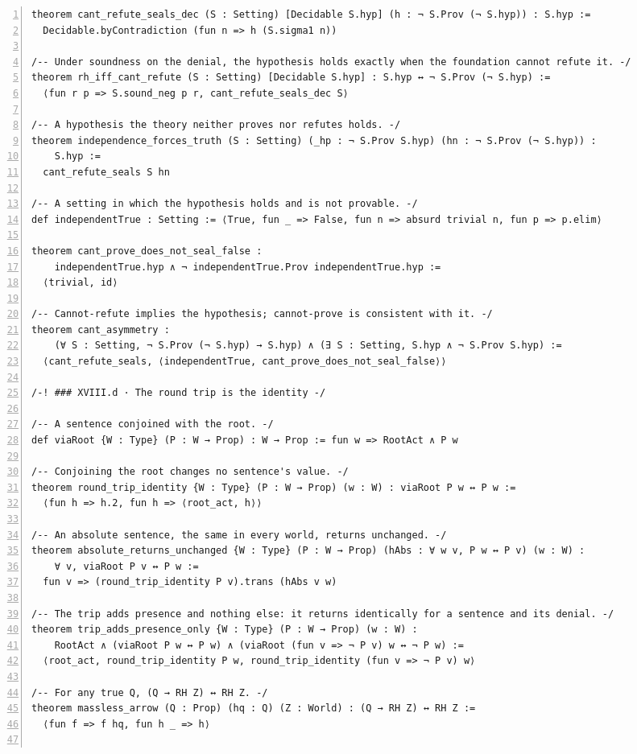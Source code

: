 \documentclass[10pt]{article}
\newcommand{\leansize}{\fontsize{5.5pt}{6.75pt}\selectfont}
\begin{document}
\begin{multicols}{2}
\begin{Verbatim}[numbers=left,firstnumber=1,numbersep=3pt,xleftmargin=2.6em,breaklines=true,breakanywhere=true,breakautoindent=false,breakindent=1.4em,breaksymbolleft={},breakanywheresymbolpre={},fontsize=\leansize]
theorem cant_refute_seals_dec (S : Setting) [Decidable S.hyp] (h : ¬ S.Prov (¬ S.hyp)) : S.hyp :=
  Decidable.byContradiction (fun n => h (S.sigma1 n))

/-- Under soundness on the denial, the hypothesis holds exactly when the foundation cannot refute it. -/
theorem rh_iff_cant_refute (S : Setting) [Decidable S.hyp] : S.hyp ↔ ¬ S.Prov (¬ S.hyp) :=
  ⟨fun r p => S.sound_neg p r, cant_refute_seals_dec S⟩

/-- A hypothesis the theory neither proves nor refutes holds. -/
theorem independence_forces_truth (S : Setting) (_hp : ¬ S.Prov S.hyp) (hn : ¬ S.Prov (¬ S.hyp)) :
    S.hyp :=
  cant_refute_seals S hn

/-- A setting in which the hypothesis holds and is not provable. -/
def independentTrue : Setting := ⟨True, fun _ => False, fun n => absurd trivial n, fun p => p.elim⟩

theorem cant_prove_does_not_seal_false :
    independentTrue.hyp ∧ ¬ independentTrue.Prov independentTrue.hyp :=
  ⟨trivial, id⟩

/-- Cannot-refute implies the hypothesis; cannot-prove is consistent with it. -/
theorem cant_asymmetry :
    (∀ S : Setting, ¬ S.Prov (¬ S.hyp) → S.hyp) ∧ (∃ S : Setting, S.hyp ∧ ¬ S.Prov S.hyp) :=
  ⟨cant_refute_seals, ⟨independentTrue, cant_prove_does_not_seal_false⟩⟩

/-! ### XVIII.d · The round trip is the identity -/

/-- A sentence conjoined with the root. -/
def viaRoot {W : Type} (P : W → Prop) : W → Prop := fun w => RootAct ∧ P w

/-- Conjoining the root changes no sentence's value. -/
theorem round_trip_identity {W : Type} (P : W → Prop) (w : W) : viaRoot P w ↔ P w :=
  ⟨fun h => h.2, fun h => ⟨root_act, h⟩⟩

/-- An absolute sentence, the same in every world, returns unchanged. -/
theorem absolute_returns_unchanged {W : Type} (P : W → Prop) (hAbs : ∀ w v, P w ↔ P v) (w : W) :
    ∀ v, viaRoot P v ↔ P w :=
  fun v => (round_trip_identity P v).trans (hAbs v w)

/-- The trip adds presence and nothing else: it returns identically for a sentence and its denial. -/
theorem trip_adds_presence_only {W : Type} (P : W → Prop) (w : W) :
    RootAct ∧ (viaRoot P w ↔ P w) ∧ (viaRoot (fun v => ¬ P v) w ↔ ¬ P w) :=
  ⟨root_act, round_trip_identity P w, round_trip_identity (fun v => ¬ P v) w⟩

/-- For any true Q, (Q → RH Z) ↔ RH Z. -/
theorem massless_arrow (Q : Prop) (hq : Q) (Z : World) : (Q → RH Z) ↔ RH Z :=
  ⟨fun f => f hq, fun h _ => h⟩


\end{Verbatim}
\end{multicols}
\end{document}
